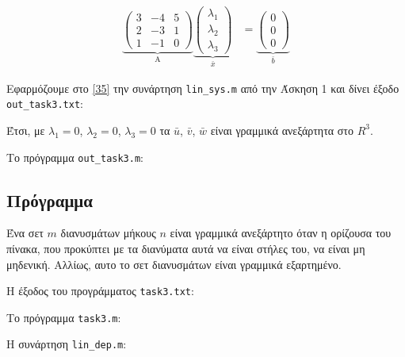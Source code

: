 \documentclass[12pt, fleqn, leqno]{extreport}
\begin{document}
\begin{equation}
    \begin{aligned}%
        \underbrace{
            \begin{pmatrix}
                3 & -4 & 5 \\
                2 & -3 & 1 \\
                1 & -1 & 0
            \end{pmatrix}
        }_\text{A}
        \underbrace{
            \begin{pmatrix}
                \lambda_{1} \\
                \lambda_{2} \\
                \lambda_{3}
            \end{pmatrix}
        }_\text{$\bar{x}$}
         & =
        \underbrace{
            \begin{pmatrix}
                0 \\
                0 \\
                0
            \end{pmatrix}
        }_\text{$\bar{b}$}
    \end{aligned}\label{35}
\end{equation}

Εφαρμόζουμε στο \eqref{35} την συνάρτηση \lstinline[language={}]{lin_sys.m} από την Άσκηση 1 και δίνει έξοδο \lstinline[language={}]{out_task3.txt}:

Έτσι, με $\lambda_{1} = 0$, $\lambda_{2} = 0$, $\lambda_{3} = 0$ τα $\bar{u}$, $\bar{v}$, $\bar{w}$ είναι γραμμικά ανεξάρτητα στο $R^{3}$.

Το πρόγραμμα \lstinline[language={}]{out_task3.m}:

\newpage

\subsection{Πρόγραμμα}

Ένα σετ $m$ διανυσμάτων μήκους $n$ είναι γραμμικά ανεξάρτητο όταν η ορίζουσα του πίνακα, που προκύπτει με τα διανύματα αυτά να είναι στήλες του, να είναι μη μηδενική. Αλλίως, αυτο το σετ διανυσμάτων είναι γραμμικά εξαρτημένο.

Η έξοδος του προγράμματος    \lstinline[language={}]{task3.txt}:


Το πρόγραμμα \lstinline[language={}]{task3.m}:


Η συνάρτηση \lstinline[language={}]{lin_dep.m}:

\end{document}
